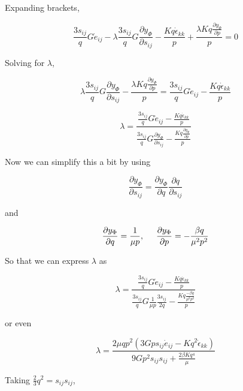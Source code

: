 \documentclass[a4paper]{article}
\begin{document}
Expanding brackets,

\begin{equation}
\frac{3s_{ij}}{q}G\dot e_{ij} - \lambda\frac{3s_{ij}}{q}G\frac{\partial y_\Phi}{\partial s_{ij}} -\frac{Kq\dot\epsilon_{kk}}{p} + \frac{\lambda Kq\frac{\partial y_\Phi}{\partial p}}{p} = 0
\end{equation}

Solving for $\lambda$,

\begin{equation}
\lambda\frac{3s_{ij}}{q}G\frac{\partial y_\Phi}{\partial s_{ij}} - \frac{\lambda Kq\frac{\partial y_\Phi}{\partial p}}{p} = \frac{3s_{ij}}{q}G\dot e_{ij} - \frac{Kq\dot\epsilon_{kk}}{p}
\end{equation}

\begin{equation}
\lambda = \frac{\frac{3s_{ij}}{q}G\dot e_{ij} - \frac{Kq\dot\epsilon_{kk}}{p}}{\frac{3s_{ij}}{q}G\frac{\partial y_\Phi}{\partial s_{ij}} - \frac{Kq\frac{\partial y_\Phi}{\partial p}}{p}}
\end{equation}

Now we can simplify this a bit by using

\begin{equation}
\frac{\partial y_\Phi}{\partial s_{ij}} = \frac{\partial y_\Phi}{\partial q}\frac{\partial q}{\partial s_{ij}}
\end{equation}

and

\begin{equation}
\frac{\partial y_\Phi}{\partial q} = \frac{1}{\mu p},\hspace{0.5cm}
\frac{\partial y_\Phi}{\partial p} = -\frac{\beta q}{\mu^2 p^2}
\end{equation}

So that we can express $\lambda$ as

\begin{equation}
\lambda = \frac{\frac{3s_{ij}}{q}G\dot e_{ij} - \frac{Kq\dot\epsilon_{kk}}{p}}{\frac{3s_{ij}}{q}G\frac{1}{\mu p}\frac{3s_{ij}}{2q} - \frac{Kq\frac{-\beta q}{\mu^2 p^2}}{p}}
\end{equation}

or even

\begin{equation}
\lambda = \frac{2\mu qp^2(3Gps_{ij}\dot e_{ij} - Kq^2\dot\epsilon_{kk})}
{9Gp^2s_{ij}s_{ij} + \frac{2\beta Kq^4}{\mu}}
\end{equation}

Taking $\frac{2}{3}q^2 = s_{ij}s_{ij}$,
\end{document}
